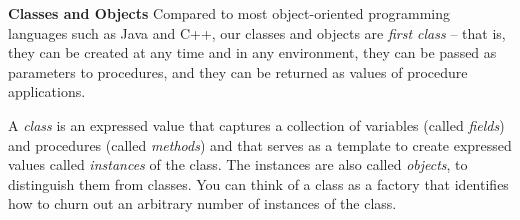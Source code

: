 \begin{minipage}[t]{\sw}
\slidenumber
\LARGE
{\bf Classes and Objects}\exx
Compared to most object-oriented programming languages
such as Java and C++, our classes and objects are
{\em first class} -- that is,
they can be created at any time and in any environment,
they can be passed as parameters to procedures,
and they can be returned as values of procedure applications.

A {\em class} is an expressed value
that captures a collection
of variables (called {\em fields})
and procedures (called {\em methods})
and that serves as a template
to create expressed values called {\em instances} of the class.
The instances are also called {\em objects},
to distinguish them from classes.
You can think of a class as a factory
that identifies how to churn out
an arbitrary number of instances of the class.
\end{minipage}
